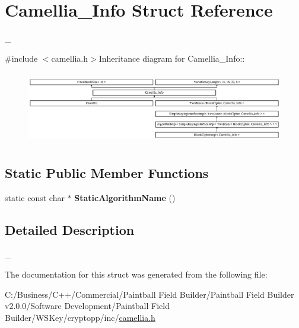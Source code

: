 \hypertarget{struct_camellia___info}{
\section{Camellia\_\-Info Struct Reference}
\label{struct_camellia___info}
}


\_\-  


{\ttfamily \#include $<$camellia.h$>$}Inheritance diagram for Camellia\_\-Info::\begin{figure}[H]
\begin{center}
\leavevmode
\includegraphics[height=3.19392cm]{struct_camellia___info}
\end{center}
\end{figure}
\subsection*{Static Public Member Functions}
\begin{DoxyCompactItemize}
\item 
\hypertarget{struct_camellia___info_af4c2284d331dbea80e67f8a9fe096fdf}{
static const char $\ast$ {\bfseries StaticAlgorithmName} ()}
\label{struct_camellia___info_af4c2284d331dbea80e67f8a9fe096fdf}

\end{DoxyCompactItemize}


\subsection{Detailed Description}
\_\- 

The documentation for this struct was generated from the following file:\begin{DoxyCompactItemize}
\item 
C:/Business/C++/Commercial/Paintball Field Builder/Paintball Field Builder v2.0.0/Software Development/Paintball Field Builder/WSKey/cryptopp/inc/\hyperlink{camellia_8h}{camellia.h}\end{DoxyCompactItemize}
